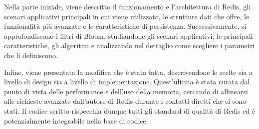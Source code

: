\documentclass[ oneside,openright,titlepage,numbers=noenddot,%
                headinclude,footinclude,cleardoublepage=empty,
                BCOR=5mm,paper=a4,fontsize=11pt
                ]{scrreprt}
\begin{document}
\begin{titlepage}
\begin{addmargin}[-2cm]{-2cm}
    \medskip

    Nella parte iniziale, viene descritto il funzionamento e l'architettura di Redis, gli scenari 
    applicativi principali in cui viene utilizzato, le strutture dati che offre, le funzionalità 
    più avanzate e le caratteristiche di persistenza. Successivamente, si approfondiscono i filtri
    di Bloom, studiandone gli scenari applicativi, le principali caratteristiche, gli algoritmi e 
    analizzando nel dettaglio come scegliere i parametri che li definiscono.

    \medskip

    Infine, viene presentata la modifica che è stata fatta, descrivendone le scelte sia a livello di 
    design sia a livello di implementazione. Quest'ultima è stata curata dal punto di vista delle 
    performance e dell'uso della memoria, cercando di allinearsi alle richieste avanzate dall'autore di 
    Redis durante i contatti diretti che ci sono stati. Il codice scritto rispecchia dunque tutti gli 
    standard di qualità di Redis ed è potenzialmente integrabile nella base di codice.

    \vfill
\end{addmargin}
\end{titlepage}
\end{document}
